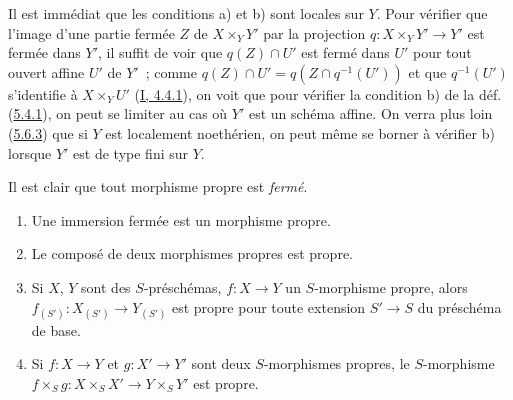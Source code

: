 Il est immédiat que les conditions a) et b) sont locales sur $Y$. Pour
vérifier que l'image d'une partie fermée $Z$ de $X\times_YY'$ par la
projection $q:X\times_YY'\to Y'$ est fermée dans $Y'$, il suffit de voir que
$q(Z)\cap U'$ est fermé dans $U'$ pour tout ouvert affine $U'$ de $Y'$~;
comme $q(Z)\cap U'=q(Z\cap q^{-1}(U'))$ et que $q^{-1}(U')$ s'identifie à
$X\times_YU'$ (\hyperref[I.4.4.1-fr]{I, 4.4.1}), on voit que pour vérifier
la condition b) de la déf. (\hyperref[II.5.4.1-fr]{5.4.1}), on peut se
limiter au cas où $Y'$ est un schéma affine. On verra plus loin
(\hyperref[II.5.6.3-fr]{5.6.3}) que si $Y$ est localement noethérien, on
peut même se borner à vérifier b) lorsque $Y'$ est de type fini sur $Y$.

Il est clair que tout morphisme propre est \emph{fermé}.

\begin{proposition}[5.4.2]
\label{II.5.4.2-fr}
\begin{enumerate}
  \item[\rm{(i)}] Une immersion fermée est un morphisme propre.
  \item[\rm{(ii)}] Le composé de deux morphismes propres est propre.
  \item[\rm{(iii)}] Si $X$, $Y$ sont des $S$-préschémas,
  $f:X\to Y$ un $S$-morphisme propre, alors
  $f_{(S')}:X_{(S')}\to Y_{(S')}$ est propre pour toute extension
  $S'\to S$ du préschéma de base.
  \item[\rm{(iv)}] Si $f:X\to Y$ et $g:X'\to Y'$ sont deux $S$-morphismes
  propres, le $S$-morphisme
  $f\times_Sg:X\times_SX'\to Y\times_SY'$ est propre.
\end{enumerate}
\end{proposition}

